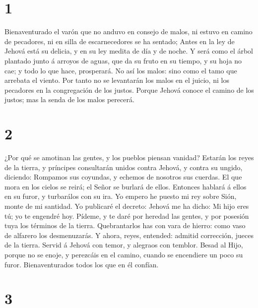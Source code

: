 \hypertarget{section}{%
\section{1}\label{section}}

 Bienaventurado el varón que no anduvo en consejo de
malos, ni estuvo en camino de pecadores, ni en silla de escarnecedores
se ha sentado;  Antes en la ley de Jehová está su delicia,
y en su ley medita de día y de noche.  Y será como el
árbol plantado junto á arroyos de aguas, que da su fruto en su tiempo, y
su hoja no cae; y todo lo que hace, prosperará.  No así
los malos: sino como el tamo que arrebata el viento.  Por
tanto no se levantarán los malos en el juicio, ni los pecadores en la
congregación de los justos.  Porque Jehová conoce el
camino de los justos; mas la senda de los malos perecerá.

\hypertarget{section-1}{%
\section{2}\label{section-1}}

 ¿Por qué se amotinan las gentes, y los pueblos piensan
vanidad?  Estarán los reyes de la tierra, y príncipes
consultarán unidos contra Jehová, y contra su ungido, diciendo:
 Rompamos sus coyundas, y echemos de nosotros sus cuerdas.
 El que mora en los cielos se reirá; el Señor se burlará
de ellos.  Entonces hablará á ellos en su furor, y
turbarálos con su ira.  Yo empero he puesto mi rey sobre
Sión, monte de mi santidad.  Yo publicaré el decreto:
Jehová me ha dicho: Mi hijo eres tú; yo te engendré hoy. 
Pídeme, y te daré por heredad las gentes, y por posesión tuya los
términos de la tierra.  Quebrantarlos has con vara de
hierro: como vaso de alfarero los desmenuzarás.  Y ahora,
reyes, entended: admitid corrección, jueces de la tierra.
 Servid á Jehová con temor, y alegraos con temblor.
 Besad al Hijo, porque no se enoje, y perezcáis en el
camino, cuando se encendiere un poco su furor. Bienaventurados todos los
que en él confían.

\hypertarget{section-2}{%
\section{3}\label{section-2}}

